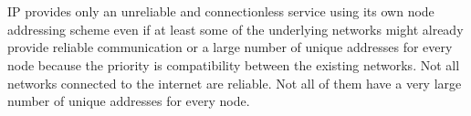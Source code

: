 \section{}
IP provides only an unreliable and connectionless service using its own node
addressing scheme even if at least some of the underlying networks might already
provide reliable communication or a large number of unique addresses for every
node because the priority is compatibility between the existing networks. Not
all networks connected to the internet are reliable. Not all of them have a very
large number of unique addresses for every node. 
